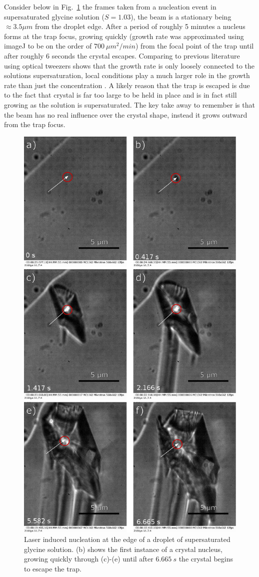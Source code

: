 Consider below in Fig.~\ref{fig:stationary_beam} the frames taken from a nucleation 
event in supersaturated glycine solution ($S=1.03$), the beam is a stationary being 
$\approx3.5 \mu m$ from the droplet edge. After a period of roughly 5 minutes a 
nucleus forms at the trap focus, growing quickly (growth rate was approximated using
imageJ to be on the order of $700\ \mu m^2/min$) from the focal point of the trap 
until after roughly $6$ seconds the crystal escapes. Comparing to previous literature
using optical tweezers shows that the growth rate is only loosely connected to the 
solutions supersaturation, local conditions play a much larger role in the growth 
rate than just the concentration \cite{Flannigan2023}. A likely reason that the trap 
is escaped is due to the fact that crystal is far too large to be held in place and 
is in fact still growing as the solution is supersaturated. The key take away to 
remember is that the beam has no real influence over the crystal shape, instead 
it grows outward from the trap focus.
\begin{figure}[h!]
	\centering
	\includegraphics[width=0.7\linewidth]{frames_no_beam_movement.pdf}
	\caption{Laser induced nucleation at the edge of a droplet of supersaturated 
	glycine solution. (b) shows the first instance of a crystal nucleus, growing 
	quickly through (c)-(e) until after $6.665\ s$ the crystal begins to escape the trap.}
	\label{fig:stationary_beam}
\end{figure}

